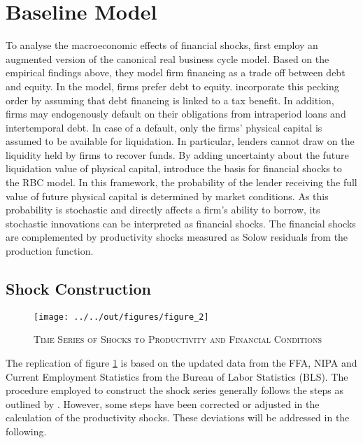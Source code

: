 \section{Baseline Model}
\label{sec:baseline_model}

To analyse the macroeconomic effects of financial shocks, \citeauthor{JERMANNfinancial} first employ an augmented version of the canonical real business cycle model. Based on the empirical findings above, they model firm financing as a trade off between debt and equity. In the model, firms prefer debt to equity. \citeauthor{JERMANNfinancial} incorporate this pecking order by assuming that debt financing is linked to a tax benefit. In addition, firms may endogenously default on their obligations from intraperiod loans and intertemporal debt. In case of a default, only the firms' physical capital is assumed to be available for liquidation. In particular, lenders cannot draw on the liquidity held by firms to recover funds. By adding uncertainty about the future liquidation value of physical capital, \citeauthor{JERMANNfinancial} introduce the basis for financial shocks to the RBC model. In this framework, the probability of the lender receiving the full value of future physical capital is determined by market conditions. As this probability is stochastic and directly affects a firm's ability to borrow, its stochastic innovations can be interpreted as financial shocks. The financial shocks are complemented by productivity shocks measured as Solow residuals from the production function.


\subsection{Shock Construction}
\label{sec:shock_construction}

\begin{figure}[t]
    \begin{center}
	    \texttt{[image: ../../out/figures/figure\_2]}
    	\caption{\textsc{Time Series of Shocks to Productivity and Financial Conditions}}
	    \label{fig:figure_2}
    \end{center}
\end{figure}

The replication of figure \ref{fig:figure_2} is based on the updated data from the FFA, NIPA and Current Employment Statistics from the Bureau of Labor Statistics (BLS). The procedure employed to construct the shock series generally follows the steps as outlined by \citeauthor{JERMANNfinancial}. However, some steps have been corrected or adjusted in the calculation of the productivity shocks. These deviations will be addressed in the following. 

